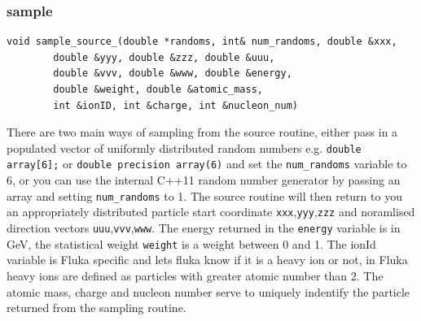 \subsubsection*{sample}
\begin{lstlisting}
void sample_source_(double *randoms, int& num_randoms, double &xxx, 
        double &yyy, double &zzz, double &uuu, 
        double &vvv, double &www, double &energy, 
        double &weight, double &atomic_mass,
        int &ionID, int &charge, int &nucleon_num)
\end{lstlisting}
There are two main ways of sampling from the source routine, either pass in a populated vector
of uniformly distributed random numbers e.g. \texttt{double array[6];} or 
\texttt{double precision array(6)} and set the \texttt{num\_randoms} variable to 6, or you 
can use the internal C++11 random number generator by passing an array and setting
\texttt{num\_randoms} to 1. The source routine will then return to you 
an appropriately distributed particle start coordinate \texttt{xxx},\texttt{yyy},\texttt{zzz} and
noramlised direction vectors \texttt{uuu},\texttt{vvv},\texttt{www}. The energy returned
in the \texttt{energy} variable is in GeV, the statistical weight \texttt{weight} is a weight
between 0 and 1. The ionId variable is Fluka specific and lets fluka know if it is a heavy
ion or not, in Fluka heavy ions are defined as particles with greater atomic number than 2. 
The atomic mass, charge and nucleon number serve to uniquely indentify the particle returned 
from the sampling routine. 



